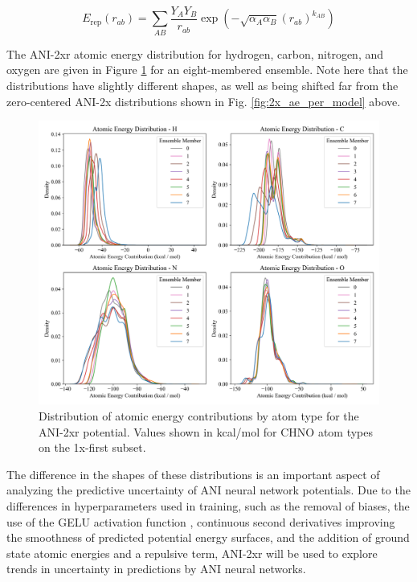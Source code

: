 \begin{equation}
\label{eq:repulsion}
    E_{\text{rep}}(r_{ab}) = 
    \sum_{AB}\frac{{Y_{A} Y_{B}}}{r_{ab}}
    \exp \left( -\sqrt{\alpha_{A} \alpha_{B}} {(r_{ab})}^{k_{AB}} \right)
\end{equation}

The ANI-2xr atomic energy distribution for hydrogen, carbon, nitrogen, and oxygen are given in Figure \ref{fig:2xr_ae_per_model} for an eight-membered ensemble.
Note here that the distributions have slightly different shapes, as well as being shifted far from the zero-centered ANI-2x distributions shown in Fig. \ref{fig:2x_ae_per_model} above.

\begin{figure}[H]
    \centering
    \includegraphics[width=1\linewidth]{Images/2xr_outputs/2xr_1x-first_ae-per-model.png}
    \caption[Atomic energies predicted by ANI-2xr]{Distribution of atomic energy contributions by atom type for the ANI-2xr potential. Values shown in kcal/mol for CHNO atom types on the 1x-first subset.}
    \label{fig:2xr_ae_per_model}
\end{figure}

The difference in the shapes of these distributions is an important aspect of analyzing the predictive uncertainty of ANI neural network potentials.
Due to the differences in hyperparameters used in training, such as the removal of biases, the use of the GELU activation function \cite{gelu}, continuous second derivatives improving the smoothness of predicted potential energy surfaces, and the addition of ground state atomic energies and a repulsive term, ANI-2xr will be used to explore trends in uncertainty in predictions by ANI neural networks. 

